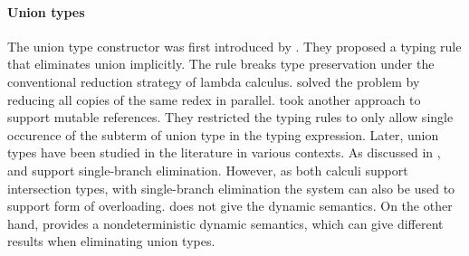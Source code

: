 \paragraph{Union types}
\begin{comment}
Set-theoretic unions have sound theory and extensively studied in
mathematics. Set-theoretic unions correspond to union types or
disjoint union types in programming languages. Disjoint union types
are also called sum types or variants.  Constructors are explicitly
labeled in disjoint union types and expressions are manipulated using
corresponding labels. Few other interesting calculi (and this paper)
do not use labels and provide type-based union elimination.
\end{comment}
The union type constructor was first introduced by \citet{macqueen1984ideal}.
They proposed a typing rule that eliminates union implicitly.
The rule breaks type preservation under
the conventional reduction strategy of lambda calculus.
\citet{barbanera1995intersection} solved the problem by reducing all
copies of the same redex in parallel.
\citet{dunfield2003type} took another approach to support
mutable references. They restricted the typing rules to only allow single
occurence of the subterm of union type in the typing expression.
Later, union types have been studied in the literature in various
contexts. As discussed in ,
\citet{pierce1991programming} and \cite{dunfield2014elaborating} support
single-branch elimination. However, as both calculi support intersection types,
with single-branch elimination the system can also be used to support form of
overloading. \citet{pierce1991programming} does not give the dynamic semantics.
On the other hand, \cite{dunfield2014elaborating} provides
a nondeterministic dynamic semantics, which can give different
results when eliminating union types.
\begin{comment}
Moreover, while \citet{dunfield2014elaborating} shows that
subtyping is not necessary for elaboration, it is not obvious how to generalize
elaboration to support subtyping relations such as
\lstinline{Student <: Person} without using the subtyping rule. If the
elaboration were generalized further to support such a subtyping relation, then
a student with type \lstinline{Student | Person} can also be tagged
non-deterministically.
\end{comment}



